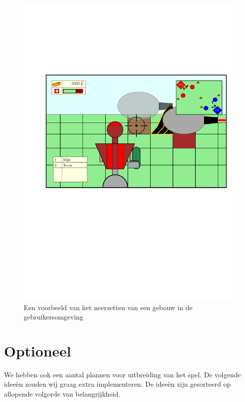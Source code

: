 \begin{figure}
\centering
\includegraphics[width=\textwidth]{Graphics/UI2.pdf}
\caption{Een voorbeeld van het neerzetten van een gebouw in de gebruikersomgeving}
\label{fig:gebouw}
\end{figure}

\section{Optioneel}
\label{sec:OPT}
We hebben ook een aantal plannen voor uitbreiding van het spel. De volgende idee\"en zouden wij graag extra implementeren. De idee\"en zijn gesorteerd op aflopende volgorde van belangrijkheid.

